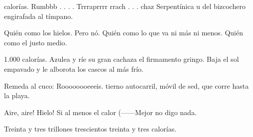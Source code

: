 \startlanguage[es]
 calorías.
Rumbbb . . . . Trrraprrrr rrach . . . chaz
Serpentínica u del bizcochero
engirafada al tímpano.

Quién como los hielos. Pero nó.
Quién como lo que va ni más ni menos.
Quién como el justo medio.

1.000 calorías.
Azulea y ríe su gran cachaza el firmamento gringo. Baja
el sol empavado y le alborota los cascos
al más frío.

Remeda al cuco: Roooooooeeeis.
tierno autocarril, móvil de sed,
que corre hasta la playa.

Aire, aire! Hielo!
Si al menos el calor (------Mejor
no digo nada.

Treinta y tres trillones trescientos treinta y tres calorías.
\stoplines
\stoplanguage
